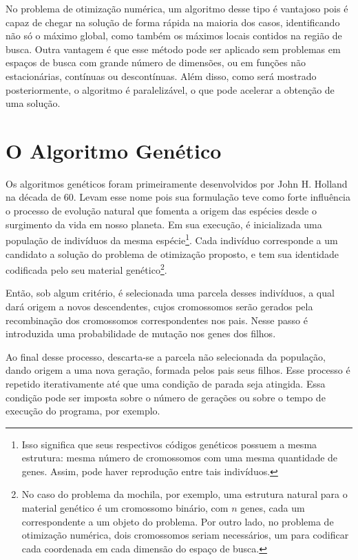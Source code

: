 No problema de otimização numérica, um algoritmo desse tipo é vantajoso pois é capaz de chegar na solução
de forma rápida na maioria dos casos, identificando não só o máximo global, como também os máximos
locais contidos na região de busca. Outra vantagem é que esse método pode ser aplicado sem problemas
em espaços de busca com grande número de dimensões, ou em funções não estacionárias, contínuas ou
descontínuas. Além disso, como será mostrado posteriormente, o algoritmo é paralelizável, o que pode
acelerar a obtenção de uma solução.

\section{O Algoritmo Genético}

Os algoritmos genéticos foram primeiramente desenvolvidos por John H. 
Holland\cite{holland1992ga}\cite{holland_wiki} na década de 60. Levam esse nome pois sua formulação teve como 
forte influência o processo de evolução natural que fomenta a origem das espécies desde o surgimento da vida
em nosso planeta. Em sua execução, é inicializada uma população de indivíduos da mesma espécie\footnote{
  Isso significa que seus respectivos códigos genéticos possuem a mesma estrutura: mesma número de
  cromossomos com uma mesma quantidade de genes. Assim, pode haver reprodução entre tais indivíduos.
}.
Cada indivíduo corresponde a um candidato a solução do problema de otimização proposto, e tem sua
identidade codificada pelo seu material genético\footnote{
  No caso do problema da mochila, por exemplo, uma
  estrutura natural para o material genético é um cromossomo binário, com $n$ genes, cada um correspondente
  a um objeto do problema. Por outro lado, no problema de otimização numérica, dois cromossomos seriam
  necessários, um para codificar cada coordenada em cada dimensão do espaço de busca.
}.

Então, sob algum critério, é selecionada uma parcela desses indivíduos, a qual dará origem a novos
descendentes, cujos cromossomos serão gerados pela recombinação dos cromossomos correspondentes nos
pais. Nesse passo é introduzida uma probabilidade de mutação nos genes dos filhos. 

Ao final desse processo, descarta-se a parcela não selecionada da população, dando origem a uma nova geração, formada
pelos pais seus filhos. Esse processo é repetido iterativamente até que uma condição de parada seja
atingida. Essa condição pode ser imposta sobre o número de gerações ou sobre o tempo de execução do programa,
por exemplo.


